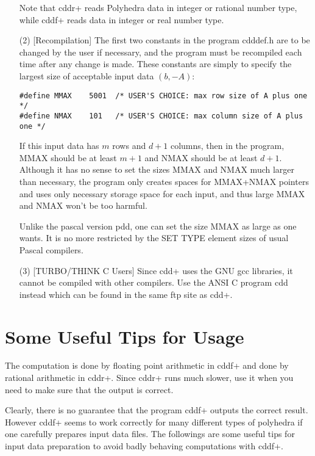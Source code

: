 \begin{itemize}
Note that cddr+ reads Polyhedra data in integer or rational
number type, while cddf+ reads data in integer or real number type.


\item[(2)] [Recompilation] The first two constants in the program cdddef.h are to be 
changed by the user if necessary, and the program must be recompiled
each time after any change is made.   These constants are simply
to specify the largest size of acceptable input data $(b, -A)$: 
\begin{verbatim}
#define MMAX    5001  /* USER'S CHOICE: max row size of A plus one */
#define NMAX    101   /* USER'S CHOICE: max column size of A plus one */
\end{verbatim}
If this input data has $m$ rows and $d+1$ columns, then in the program,
MMAX should be at least $m+1$ and NMAX should be at least
$d+1$.  Although it has no sense to set the sizes MMAX and NMAX much larger
than necessary, the program only creates spaces for MMAX+NMAX pointers
and uses only necessary storage space for each input, and
thus large MMAX and NMAX won't be too harmful.

Unlike the pascal version pdd, one can set the size MMAX as large as one
wants.  It is no more restricted by the SET TYPE element sizes of 
usual Pascal compilers.

\item[(3)] [TURBO/THINK C Users]   Since cdd+ uses the GNU gcc libraries,
it cannot be compiled with other compilers.  Use  the ANSI C program cdd
instead which can be found in the same ftp site as cdd+.
\end{itemize}


\section{Some  Useful Tips for Usage}  \label{TIPS}

The computation is done by floating point arithmetic in cddf+ and
done by rational arithmetic in cddr+.    Since cddr+ runs much slower,
use it when you need to make sure that the output is correct.

Clearly, there is no guarantee 
that the program cddf+ outputs the correct result.  
However cddf+ seems to work correctly 
for many different types of polyhedra if one
carefully prepares input data files.   The followings
are some useful tips  for  input data preparation to 
avoid badly behaving computations with cddf+.

